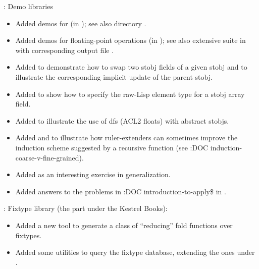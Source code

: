 \begin{frame}

\implibtitle

:
Demo libraries
\begin{itemize}
\item Added demos for  (in
      );
      see also directory .
\item Added demos for floating-point operations (in );
      see also extensive suite in 
      with corresponding output file .
\item Added  to demonstrate how
      to swap two stobj fields of a given stobj and to illustrate the
      corresponding implicit update of the parent stobj.
\item Added  to show how to specify
      the raw-Lisp  element type for a stobj array field.
\item Added  to illustrate
      the use of dfs (ACL2 floats) with abstract stobjs.
\item Added  and
       to illustrate how
      ruler-extenders can sometimes improve the induction scheme
      suggested by a recursive function (see :DOC
      induction-coarse-v-fine-grained).
\item Added  as an interesting exercise in
      generalization.
\item Added answers to the problems in :DOC introduction-to-apply\$ in
      .
\end{itemize}

\end{frame}


\begin{frame}

\implibtitle

:
Fixtype library (the part under the Kestrel Books):
\begin{itemize}
\item Added a new  tool
      to generate a class of ``reducing'' fold functions over fixtypes.
\item Added some utilities to query the fixtype database,
      extending the ones under .
\end{itemize}

\end{frame}

